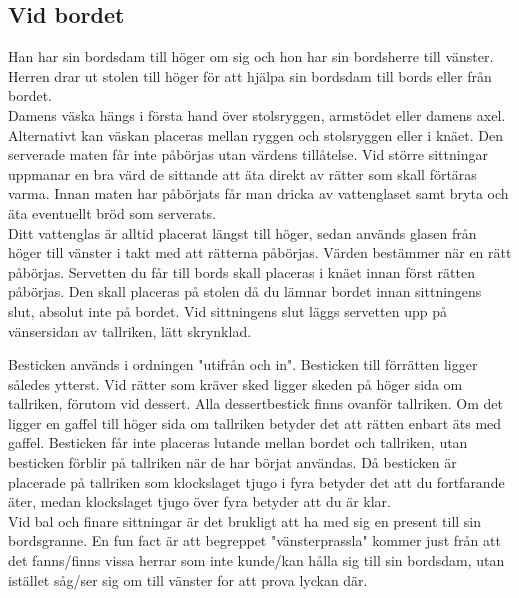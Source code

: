 \subsection*{Vid bordet}
Han har sin bordsdam till höger om sig och hon har sin bordsherre till vänster.
Herren drar ut stolen till höger för att hjälpa sin bordsdam till bords eller från bordet.
\\

Damens väska hängs i första hand över stolsryggen, armstödet eller damens axel.
Alternativt kan väskan placeras mellan ryggen och stolsryggen eller i knäet.
Den serverade maten får inte påbörjas utan värdens tillåtelse.
Vid större sittningar uppmanar en bra värd de sittande att äta direkt av rätter som skall förtäras varma.
Innan maten har påbörjats får man dricka av vattenglaset samt bryta och äta eventuellt bröd som serverats.
\\

Ditt vattenglas är alltid placerat längst till höger, sedan används glasen från höger till vänster i takt med att rätterna påbörjas.
Värden bestämmer när en rätt påbörjas.
Servetten du får till bords skall placeras i knäet innan först rätten påbörjas. Den skall placeras på stolen då du lämnar bordet innan sittningens slut, absolut inte på bordet.
Vid sittningens slut läggs servetten upp på vänsersidan av tallriken, lätt skrynklad.
\\

\newpage

Besticken används i ordningen "utifrån och in".
Besticken till förrätten ligger således ytterst.
Vid rätter som kräver sked ligger skeden på höger sida om tallriken, förutom vid dessert.
Alla dessertbestick finns ovanför tallriken.
Om det ligger en gaffel till höger sida om tallriken betyder det att rätten enbart äts med gaffel.
Besticken får inte placeras lutande mellan bordet och tallriken, utan besticken förblir på tallriken när de har börjat användas. 
Då besticken är placerade på tallriken som klockslaget tjugo i fyra betyder det att du fortfarande äter,
medan klockslaget tjugo över fyra betyder att du är klar.
\\

Vid bal och finare sittningar är det brukligt att ha med sig en present till sin bordsgranne. 
En fun fact är att begreppet "vänsterprassla" kommer just från att det fanns/finns vissa herrar som inte kunde/kan hålla sig till sin bordsdam, 
utan istället såg/ser sig om till vänster for att prova lyckan där.

\newpage

